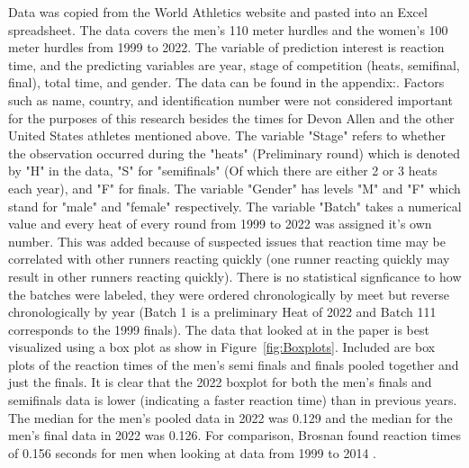 \documentclass[12pt, letterpaper, titlepage]{article}
\begin{document}
Data was copied from the World Athletics website and pasted into an Excel
spreadsheet. The data covers the men's 110 meter hurdles and the women's 100
meter hurdles from 1999 to 2022.  The variable of prediction interest is reaction
time, and the predicting variables are year, stage of competition (heats, 
semifinal, final), total time, and gender.  The data can be found in the appendix:.  
Factors such as name, country, and identification number were
not considered important for the purposes of this research besides the times for
Devon Allen and the other United States athletes mentioned above.  The variable "Stage"
refers to whether the observation occurred during the "heats" (Preliminary round) which
is denoted by "H" in the data, "S" for "semifinals" (Of which there are either 2 or 3 
heats each year), and "F" for finals. The variable "Gender" has levels "M" and "F" 
which stand for "male" and "female" respectively.  The variable "Batch" takes a 
numerical value and every heat of every round from 1999 to 2022 was assigned it's
own number.  This was added because of suspected issues that reaction time may be
correlated with other runners reacting quickly (one runner reacting quickly may
result in other runners reacting quickly).  There is no statistical signficance to
how the batches were labeled, they were ordered chronologically by meet but
reverse chronologically by year (Batch 1 is a preliminary Heat of 2022 and Batch
111 corresponds to the 1999 finals). The data that looked at in the paper
is best visualized using a box plot as show in Figure~\ref{fig:Boxplots}.  Included are
box plots of the reaction times of the men's semi finals and finals pooled
together and just the finals.  It is clear that the 2022 boxplot for both the
men's finals and semifinals data is lower (indicating a faster reaction time)
than in previous years.  The median for the men's pooled data in 2022 was 0.129
and the median for the men's final data in 2022 was 0.126.  For comparison,
Brosnan found reaction times of 0.156 seconds for men when looking at data from
1999 to 2014 \citep{brosnan2017effects}.
\end{document}
